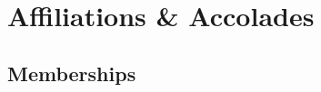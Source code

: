 \documentclass[11pt,a4paper, final, factor=1100, stretch=18, shrink=18]{moderncv}
\newcommand{\spacesection}{\vspace{0.4cm}}
\newcommand{\spacesubsection}{\vspace{0.2cm}}
\begin{document}


\spacesection
\section{Affiliations \& Accolades}

\spacesubsection
\subsection{Memberships}
\end{document}
